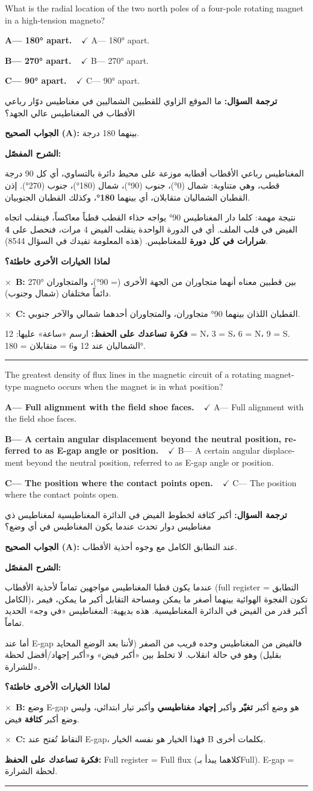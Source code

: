 \documentclass[11pt,a4paper]{article}
\newcommand{\en}[1]{\textenglish{#1}}
\newcommand{\correctletter}{}
\newcommand{\opt}[2]{%
  \ifdefstring{\correctletter}{#1}%
    {\textcolor{ansgreen}{\textbf{#1— #2\ \ $\checkmark$}}}%
    {#1— #2}\par}
\newcommand{\Q}[6]{%
  \renewcommand{\correctletter}{#6}%
  \par\bigskip
  \phantomsection\label{q#1}%
  \begin{tcolorbox}[enhanced,breakable,colback=qback,colframe=qframe,
      arc=2mm,boxrule=0.8pt,fonttitle=\bfseries,
      title={\en{Question #1}}]
    \begin{english}
      #2\par\smallskip
      \opt{A}{#3}\opt{B}{#4}\opt{C}{#5}
    \end{english}
  \end{tcolorbox}}
\newcommand{\tr}[1]{\textbf{\textcolor{qframe}{ترجمة السؤال:}} #1\par}
\newcommand{\ans}[2]{%
  \begin{tcolorbox}[colback=ansback,colframe=ansgreen,boxrule=0.6pt,arc=1.5mm,
      left=4pt,right=4pt,top=2pt,bottom=2pt]
    \textbf{\textcolor{ansgreen}{الجواب الصحيح (\en{#1}):}} #2
  \end{tcolorbox}}
\newcommand{\sharh}[1]{\textbf{\textcolor{conceptc}{الشرح المفصّل:}}\par #1\par}
\newcommand{\nohead}{\textbf{\textcolor{wrongc}{لماذا الخيارات الأخرى خاطئة؟}}\par}
\newcommand{\no}[2]{\hspace*{1em}\textcolor{wrongc}{$\times$}\ \textbf{\en{#1}:} #2\par}
\newcommand{\tip}[1]{%
  \begin{tcolorbox}[colback=tipback,colframe=tipframe,boxrule=0.5pt,arc=1.5mm,
      left=4pt,right=4pt,top=2pt,bottom=2pt]
    \textbf{فكرة تساعدك على الحفظ:} #1
  \end{tcolorbox}}
\newcommand{\qsep}{\par\medskip\noindent\textcolor{qframe!40}{\rule{\linewidth}{0.4pt}}\par}
\begin{document}
\Q{8516}{What is the radial location of the two north poles of a four-pole rotating magnet in a high-tension magneto?}
{180° apart.}
{270° apart.}
{90° apart.}{A}
\tr{ما الموقع الزاوي للقطبين الشماليين في مغناطيس دوّار رباعي الأقطاب في المغناطيس عالي الجهد؟}
\ans{A}{بينهما 180 درجة.}
\sharh{المغناطيس رباعي الأقطاب أقطابه موزعة على محيط دائرة بالتساوي، أي كل 90 درجة قطب، وهي متناوبة: شمال (0°)، جنوب (90°)، شمال (180°)، جنوب (270°). إذن القطبان الشماليان متقابلان، أي بينهما \textbf{180°}، وكذلك القطبان الجنوبيان.

نتيجة مهمة: كلما دار المغناطيس 90° يواجه حذاء القطب قطباً معاكساً، فينقلب اتجاه الفيض في قلب الملف. أي في الدورة الواحدة ينقلب الفيض 4 مرات، فنحصل على \textbf{4 شرارات في كل دورة} للمغناطيس. (هذه المعلومة تفيدك في السؤال 8544).}
\nohead
\no{B}{270° بين قطبين معناه أنهما متجاوران من الجهة الأخرى (= 90°)، والمتجاوران دائماً مختلفان (شمال وجنوب).}
\no{C}{القطبان اللذان بينهما 90° متجاوران، والمتجاوران أحدهما شمالي والآخر جنوبي.}
\tip{ارسم «ساعة» عليها: 12 = \en{N}، 3 = \en{S}، 6 = \en{N}، 9 = \en{S}. الشماليان عند 12 و6 = متقابلان = 180°.}
\qsep

\Q{8506}{The greatest density of flux lines in the magnetic circuit of a rotating magnet-type magneto occurs when the magnet is in what position?}
{Full alignment with the field shoe faces.}
{A certain angular displacement beyond the neutral position, referred to as E-gap angle or position.}
{The position where the contact points open.}{A}
\tr{أكبر كثافة لخطوط الفيض في الدائرة المغناطيسية لمغناطيس ذي مغناطيس دوار تحدث عندما يكون المغناطيس في أي وضع؟}
\ans{A}{عند التطابق الكامل مع وجوه أحذية الأقطاب.}
\sharh{عندما يكون قطبا المغناطيس مواجهين تماماً لأحذية الأقطاب (\en{full register} = التطابق الكامل)، تكون الفجوة الهوائية بينهما أصغر ما يمكن ومساحة التقابل أكبر ما يمكن، فيمر أكبر قدر من الفيض في الدائرة المغناطيسية. هذه بديهية: المغناطيس «في وجه» الحديد تماماً.

أما عند \en{E-gap} فالفيض من المغناطيس وحده قريب من الصفر (لأننا بعد الوضع المحايد بقليل) وهو في حالة انقلاب. لا تخلط بين «أكبر فيض» و«أكبر إجهاد/أفضل لحظة للشرارة».}
\nohead
\no{B}{وضع \en{E-gap} هو وضع أكبر \textbf{تغيّر} وأكبر \textbf{إجهاد مغناطيسي} وأكبر تيار ابتدائي، وليس وضع أكبر \textbf{كثافة} فيض.}
\no{C}{النقاط تُفتح عند \en{E-gap}، فهذا الخيار هو نفسه الخيار B بكلمات أخرى.}
\tip{\en{Full register} = \en{Full flux} (كلاهما يبدأ بـ\en{Full}). \en{E-gap} = لحظة الشرارة.}
\qsep
\end{document}
